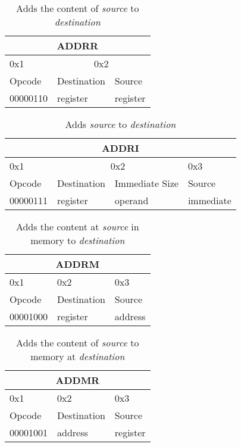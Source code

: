 \documentclass{article}
\begin{document}
\begin{table}[H]
  \centering
  \begin{tabular} { | p{2cm} | | p{2cm} | p{2cm} |}
    \hline
    \multicolumn{3}{|c|}{ADDRR}\\
    \hline
    0x1 & \multicolumn{2}{|c|}{0x2}\\
    \hline
    Opcode & Destination & Source\\
    00000110 & register & register\\
    \hline
  \end{tabular}
  \caption{Adds the content of \textit{source} to \textit{destination}}
\end{table}

\begin{table}[H]
  \centering
  \begin{tabular} { | p{2cm} | | p{2cm} | p{} | | p{2cm} |}
    \hline
    \multicolumn{4}{|c|}{ADDRI}\\
    \hline
    0x1 & \multicolumn{2}{|c|}{0x2} & 0x3\\
    \hline
    Opcode & Destination & Immediate Size & Source\\
    00000111 & register & operand & immediate\\
    \hline
  \end{tabular}
  \caption{Adds \textit{source} to \textit{destination}}
\end{table}

\begin{table}[H]
  \centering
  \begin{tabular} { | p{2cm} | | p{2cm} | p{2cm} |}
    \hline
    \multicolumn{3}{|c|}{ADDRM}\\
    \hline
    0x1 & 0x2 & 0x3\\
    \hline
    Opcode & Destination & Source\\
    00001000 & register & address\\
    \hline
  \end{tabular}
  \caption{Adds the content at \textit{source} in memory to \textit{destination}}
\end{table}

\begin{table}[H]
  \centering
  \begin{tabular} { | p{2cm} | | p{2cm} | p{2cm} |}
    \hline
    \multicolumn{3}{|c|}{ADDMR}\\
    \hline
    0x1 & 0x2 & 0x3\\
    \hline
    Opcode & Destination & Source\\
    00001001 & address & register\\
    \hline
  \end{tabular}
  \caption{Adds the content of \textit{source} to memory at \textit{destination}}
\end{table}
\end{document}
